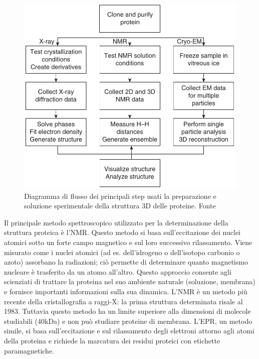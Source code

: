 {\begin{figure}[!htb]
	\centering
	\includegraphics[scale=0.5]{images/metodi-sperimentali.png}
	\caption{Diagramma di flusso dei principali step usati la preparazione e soluzione sperimentale della struttura 3D delle proteine. Fonte\cite{baxevanis2020bioinformatics}}
	\label{fig:metodi-sper1}
\end{figure}

\par Il principale metodo spettroscopico utilizzato per la determinazione della struttura proteica è l'NMR. Questo metodo si basa sull'eccitazione dei nuclei atomici sotto un forte campo magnetico e sul loro successivo rilassamento. Viene misurato come i nuclei atomici (ad es. dell'idrogeno o dell'isotopo carbonio o azoto) assorbano la radiazioni; ciò permette di determinare quanto magnetismo nucleare è trasferito da un atomo all'altro. Questo approccio consente agli scienziati di trattare la proteina nel suo ambiente naturale (soluzione, membrana) e fornisce importanti informazioni sulla sua dinamica. L'NMR è un metodo più recente della cristallografia a raggi-X: la prima struttura determinata risale al 1983. Tuttavia questo metodo ha un limite superiore alla dimensioni di molecole studiabili (40kDa) e non può studiare proteine di membrana. L'EPR, un metodo simile, si basa sull'eccitazione e sul rilassamento degli elettroni attorno agli atomi della proteina e richiede la marcatura dei residui proteici con etichette paramagnetiche. \\

}
